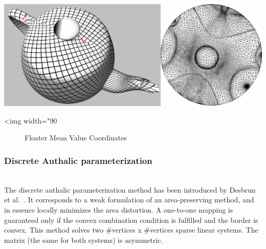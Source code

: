 \begin{center}
    \label{Surface_mesh_parameterization-fig-floater}
    \begin{ccTexOnly}
      \includegraphics[width=1.0\textwidth]{Surface_mesh_parameterization/floater}
    \end{ccTexOnly}
    \begin{ccHtmlOnly}
        <img width="90%
    \end{ccHtmlOnly}
    \begin{figure}[h]
        \caption{Floater Mean Value Coordinates}
    \end{figure}
\end{center}

\subsubsection{Discrete Authalic parameterization}

  \\

The discrete authalic parameterization method has been introduced by
Desbrun et al.~\cite{cgal:dma-ipsm-02}. It corresponds to
a weak formulation of an area-preserving method, and in essence
locally minimizes the area distortion. A one-to-one mapping is
guaranteed only if the convex combination condition is fulfilled and
the border is convex. This method solves two
\#vertices x \#vertices sparse linear systems. The matrix (the same
for both systems) is asymmetric.

